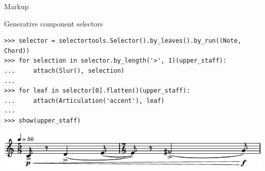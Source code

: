 \begin{frame}[fragile]{Markup}
\end{frame}

\begin{frame}[fragile]{Generative component selectors}

\begin{abjadbookoutput}
\begin{singlespacing}
\vspace{-0.5\baselineskip}
\begin{verbatim}
>>> selector = selectortools.Selector().by_leaves().by_run((Note, Chord))
>>> for selection in selector.by_length('>', 1)(upper_staff):
...     attach(Slur(), selection)
...
>>> for leaf in selector[0].flatten()(upper_staff):
...     attach(Articulation('accent'), leaf)
...
>>> show(upper_staff)
\end{verbatim}
\noindent\includegraphics[max width=\textwidth,]{assets/lilypond-a7ec7b445307363d41998bfba7240e5f.pdf}
\end{singlespacing}
\end{abjadbookoutput}

\end{frame}

